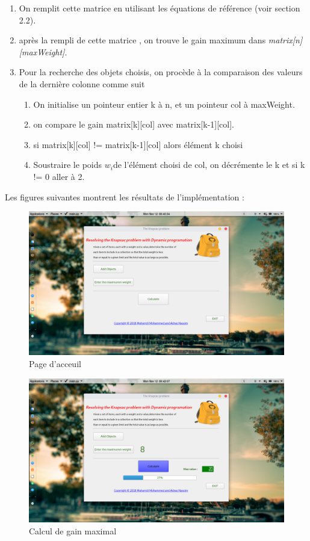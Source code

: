 \documentclass[12pt]{report}
\begin{document}
\begin{enumerate}
		\item On remplit cette matrice en utilisant les équations de référence (voir section 2.2).
		\item après la rempli de cette matrice , on trouve le gain maximum dans \emph{matrix[n][maxWeight]}.
		\item Pour la recherche des objets choisis, on procède à la comparaison des valeurs de la dernière colonne comme suit
		\begin{enumerate}
		\item On initialise un pointeur entier k à n, et un pointeur col à  maxWeight.
		\item on compare le gain matrix[k][col] avec matrix[k-1][col].
		\item si matrix[k][col] != matrix[k-1][col] alors élément k choisi
		\item Soustraire le poids $w_{i}$de l'élément choisi de col, on décrémente le k et si k != 0 aller à 2.
		\end{enumerate}
	\end{enumerate}
	\par{}
	Les figures suivantes montrent les résultats de l'implémentation :
	\begin{figure}[hp]
\centering
\includegraphics[scale=1, width=18cm]{../screenshots/1.png}
	\caption{Page d'acceuil}
	\end{figure}
	\begin{figure}[h!]
	\centering
	\includegraphics[scale=1, width=18cm]{../screenshots/4.png}
	\caption{Calcul de gain maximal}
	\end{figure}
\end{document}
